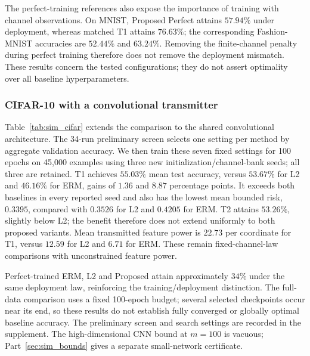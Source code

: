 The perfect-training references also expose the importance of training
with channel observations. On MNIST, Proposed Perfect attains $57.94\%$
under deployment, whereas matched T1 attains $76.63\%$; the corresponding
Fashion-MNIST accuracies are $52.44\%$ and $63.24\%$. Removing the
finite-channel penalty during perfect training therefore does not remove
the deployment mismatch. These results concern the tested configurations;
they do not assert optimality over all baseline hyperparameters.

\subsubsection{CIFAR-10 with a convolutional transmitter}
Table~\ref{tab:sim_cifar} extends the comparison to the shared convolutional
architecture. The 34-run preliminary screen selects one setting per method
by aggregate validation accuracy. We then train these seven fixed settings
for 100 epochs on 45,000 examples using three new initialization/channel-bank
seeds; all three are retained. T1 achieves $55.03\%$ mean test accuracy,
versus $53.67\%$ for L2 and $46.16\%$ for ERM, gains of $1.36$ and $8.87$
percentage points. It exceeds both baselines in every reported seed and
also has the lowest mean bounded risk, $0.3395$, compared with $0.3526$
for L2 and $0.4205$ for ERM. T2 attains $53.26\%$, slightly below L2;
the benefit therefore does not extend uniformly to both proposed variants.
Mean transmitted feature power is $22.73$ per coordinate for T1, versus
$12.59$ for L2 and $6.71$ for ERM. These remain fixed-channel-law
comparisons with unconstrained feature power.

Perfect-trained ERM, L2 and Proposed attain approximately $34\%$ under
the same deployment law, reinforcing the training/deployment distinction.
The full-data comparison uses a fixed 100-epoch budget; several selected
checkpoints occur near its end, so these results do not establish fully
converged or globally optimal baseline accuracy. The preliminary screen
and search settings are recorded in the supplement. The high-dimensional
CNN bound at $m=100$ is vacuous; Part~\ref{sec:sim_bounds} gives a separate
small-network certificate.
